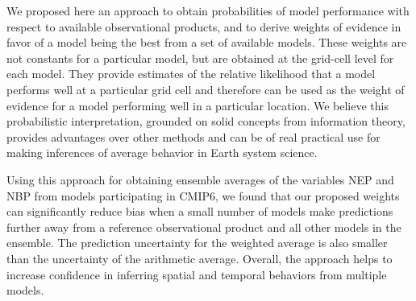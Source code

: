 \documentclass[gmd, manuscript]{copernicus}
\begin{document}
\conclusions  %
We proposed here an approach to obtain probabilities of model performance with respect to available observational products, and to derive weights of evidence in favor of a model being the best from a set of available models. These weights are not constants for a particular model, but are obtained at the grid-cell level for each model. They provide estimates of the relative likelihood that a model performs well at a particular grid cell and therefore can be used as the weight of evidence for a model performing well in a particular location. We believe this probabilistic interpretation, grounded on solid concepts from information theory, provides advantages over other methods and can be of real practical use for making inferences of average behavior in Earth system science. 

Using this approach for obtaining ensemble averages of the variables NEP and NBP from models participating in CMIP6, we found that our proposed weights can significantly reduce bias when a small number of models make predictions further away from a reference observational product and all other models in the ensemble. The prediction uncertainty for the weighted average is also smaller than the uncertainty of the arithmetic average. Overall, the approach helps to increase confidence in inferring spatial and temporal behaviors from multiple models.








\end{document}
